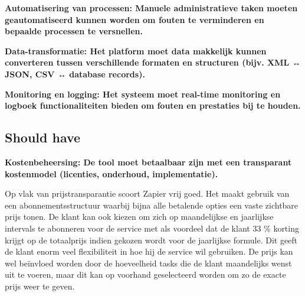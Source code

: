 \textbf{Automatisering van processen: Manuele administratieve taken moeten geautomatiseerd kunnen worden om fouten te verminderen en bepaalde processen te versnellen.}

\vspace{\baselineskip}



\vspace{\baselineskip}
\textbf{Data-transformatie: Het platform moet data makkelijk kunnen converteren tussen verschillende formaten en structuren (bijv. XML ↔ JSON, CSV ↔ database records).}

\vspace{\baselineskip}



\vspace{\baselineskip}


\textbf{Monitoring en logging: Het systeem moet real-time monitoring en logboek functionaliteiten bieden om fouten en prestaties bij te houden.}

\vspace{\baselineskip}



\vspace{\baselineskip}

\subsection{Should have}%
\label{ShouldHaveZapier}

\textbf{Kostenbeheersing: De tool moet betaalbaar zijn met een transparant kostenmodel (licenties, onderhoud, implementatie).}

\vspace{\baselineskip}

Op vlak van prijstransparantie scoort Zapier vrij goed. Het maakt gebruik van een abonnementsstructuur waarbij bijna alle betalende opties een vaste zichtbare prijs tonen. De klant kan ook kiezen om zich op maandelijkse en jaarlijkse intervals te abonneren voor de service met als voordeel dat de klant 33 \% korting krijgt op de totaalprijs indien gekozen wordt voor de jaarlijkse formule. Dit geeft de klant enorm veel flexibiliteit in hoe hij de service wil gebruiken. De prijs kan wel beïnvloed worden door de hoeveelheid tasks die de klant maandelijks wenst uit te voeren, maar dit kan op voorhand geselecteerd worden om zo de exacte prijs weer te geven.

\vspace{\baselineskip}

